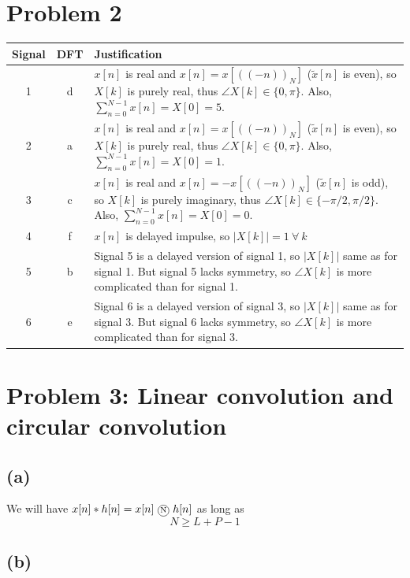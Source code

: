 \documentclass{article}
\begin{document}
\section{Problem 2}	
	\begin{center}
		\begin{tabular}{c|c|p{10cm}}
			Signal & DFT & Justification \\
			\hline
			1 & d & $x[n]$ is real and $x[n] = x[((-n))_N]$ ($\tilde{x}[n]$ is even), so $X[k]$ is purely real, thus $\angle X[k] \in \{0, \pi\}$. Also, $\sum_{n =0}^{N-1}x[n] = X[0] = 5$. \\
			\hline
			2 & a & $x[n]$ is real and $x[n] = x[((-n))_N]$ ($\tilde{x}[n]$ is even), so $X[k]$ is purely real, thus $\angle X[k] \in \{0, \pi\}$. Also, $\sum_{n =0}^{N-1}x[n] = X[0] = 1$. \\
			\hline
			3 & c & $x[n]$ is real and $x[n] = -x[((-n))_N]$ ($\tilde{x}[n]$ is odd), so $X[k]$ is purely imaginary, thus $\angle X[k] \in \{-\pi/2, \pi/2\}$. Also, $\sum_{n =0}^{N-1}x[n] = X[0] = 0$. \\
			\hline
			4 & f & $x[n]$ is delayed impulse, so $|X[k]| = 1~\forall~k$ \\
			\hline
			5 & b & Signal 5 is a delayed version of signal 1, so $|X[k]|$ same as for signal 1. But signal 5 lacks symmetry, so $\angle X[k]$ is more complicated than for signal 1.\\
			\hline
			6 & e & Signal 6 is a delayed version of signal 3, so $|X[k]|$ same as for signal 3. But signal 6 lacks symmetry, so $\angle X[k]$ is more complicated than for signal 3. \\
			\hline
		\end{tabular}
	\end{center}


\section{Problem 3: Linear convolution and circular convolution}	
\subsection{(a)}
We will have $x[n]\ast h[n] = x[n]~\encircle{N}~h[n]$ as long as
\begin{equation}
	N \geq L + P - 1
\end{equation}
\subsection{(b)}
\end{document}
